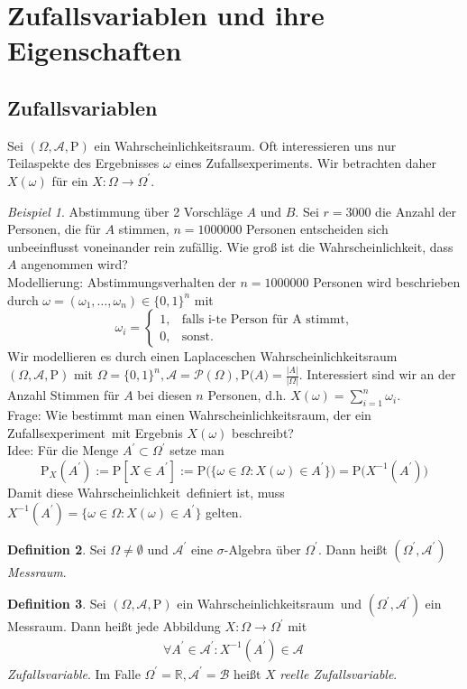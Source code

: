 \documentclass[a4paper,12pt,fleqn]{scrartcl}
\newcommand{\R}{\mathbb{R}}
\newcommand{\m}[1]{\mathcal{ #1 }}
\newcommand{\p}[1]{\text{P(} #1 \text{)}}
\newcommand{\ZE}{Zufallsexperiment}
\newcommand{\WR}{Wahrscheinlichkeitsraum}
\newcommand{\Wk}{Wahrscheinlichkeit}
\newcommand{\ZV}{Zufallsvariable}
\theoremstyle{definition}
\newtheorem{definition}{Definition}[section]
\theoremstyle{plain}
\theoremstyle{remark}
\newtheorem{beispiel}[definition]{Beispiel}
\begin{document}
\section{Zufallsvariablen und ihre Eigenschaften}
\subsection{Zufallsvariablen}
Sei $( \Omega , \m{A} , \text{P})$ ein \WR. Oft interessieren uns nur Teilaspekte des Ergebnisses $\omega$ eines \ZE s. Wir betrachten daher $X( \omega ) $ für ein $X : \Omega \rightarrow \Omega^\prime$.
\begin{beispiel}
Abstimmung über 2 Vorschläge $A$ und $B$. Sei $r=3000$ die Anzahl der Personen, die für $A$ stimmen, $n=1000000$ Personen entscheiden sich unbeeinflusst voneinander rein zufällig. Wie groß ist die \Wk, dass $A$ angenommen wird? \\
Modellierung: Abstimmungsverhalten der $n=1000000$ Personen wird beschrieben durch $\omega = ( \omega_1, \ldots , \omega_n) \in \{ 0,1 \}^n$ mit 
\[\omega_i =\begin{cases}1,&\text{falls i-te Person für A stimmt,}\\0,&\text{sonst.}\end{cases}\]
Wir modellieren es durch einen Laplaceschen \WR \, $(\Omega , \m{A} , \text{P})$ mit $ \Omega = \{ 0,1 \}^n , \m{A} = \m{P}(\Omega) , \p{A} = \frac{|A|}{| \Omega|}$. Interessiert sind wir an der Anzahl Stimmen für $A$ bei diesen $n$ Personen, d.h. $X( \omega) = \sum_{i=1}^{n}{ \omega_i }$. \\
Frage: Wie bestimmt man einen \WR, der ein \ZE \, mit Ergebnis $X( \omega)$ beschreibt? \\
Idee: Für die Menge $A^\prime \subset \Omega^\prime$ setze man 
\[\text{P}_X(A^\prime) := \text{P}[X \in A^\prime] := \p{\{ \omega \in \Omega : X( \omega ) \in A^\prime \}} = \p{X^{-1}(A^\prime)}\]
Damit diese \Wk \, definiert ist, muss $X^{-1}(A^\prime) = \{ \omega \in \Omega : X( \omega ) \in A^\prime \}$ gelten.
\end{beispiel}
\begin{definition}
Sei $\Omega \neq \emptyset$ und $\m{A}^\prime$ eine $\sigma$-Algebra über $\Omega^\prime$. Dann heißt $(\Omega^\prime, \m{A}^\prime)$ \emph{Messraum}.
\end{definition}
\begin{definition}
Sei $( \Omega , \m{A} , \text{P})$ ein \WR \, und $(\Omega^\prime, \m{A}^\prime)$ ein Messraum. Dann heißt jede Abbildung $X: \Omega \rightarrow \Omega^\prime$ mit
\begin{align*}
 \forall A^\prime \in \m{A}^\prime :X^{-1}(A^\prime) \in \m{A} \,  \tag{*}
\end{align*} 
\emph{Zufallsvariable}. Im Falle $\Omega^\prime = \R, \m{A}^\prime = \m{B}$ heißt $X$ \emph{reelle \ZV}.
\end{definition}
\end{document}
